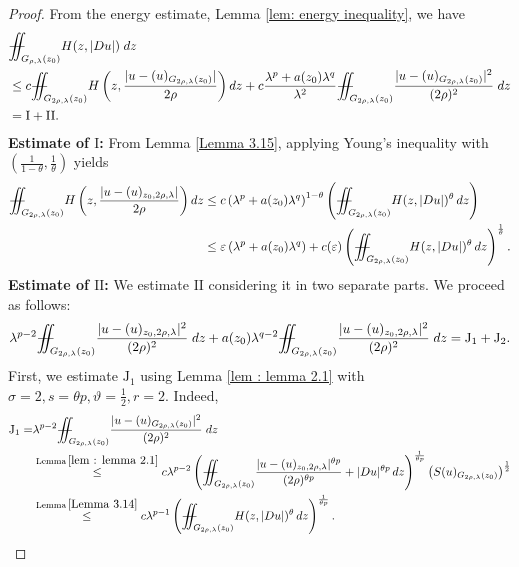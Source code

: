 \documentclass[notitlepage,11pt,reqno]{amsart}
\theoremstyle{definition}
\numberwithin{equation}{section}
\newcommand{\iintss}{{\int\hspace{-0.28cm}\int}}
\newcommand{ \miints }{{\iintss\hspace{-0.56cm} -\hspace{-0.15cm}-}}
\newcommand{\miint}[1]{{\miints_{\hspace{-0.13cm}#1}}}
\begin{document}
\begin{proof}
    From the energy estimate, Lemma \ref{lem: energy inequality}, we have
\begin{align*}
&\miint{G_{\rho, \lambda}(z_0)}H(z,|Du|)\;dz\\
& \leq c \miint{G_{2\rho, \lambda}(z_0)}  H\left(z,\frac{|u-(u)_{G_{2\rho, \lambda}(z_0)}|}{2\rho}\right) dz+ c\frac{\lambda^p+a(z_0)\lambda^q}{\lambda^2}\miint{G_{2\rho, \lambda}(z_0)}\frac{|u-(u)_{G_{2\rho, \lambda}(z_0)}|^2}{(2\rho)^2}\;dz\\
&= \mathrm{I}+\mathrm{II}.
\end{align*}
\textbf{Estimate of $\mathrm{I}$:} From Lemma \ref{Lemma 3.15}, applying Young's inequality with $\left(\frac{1}{1-\theta}, \frac{1}{\theta}\right)$ yields
\begin{align*}
\miint{G_{2\rho, \lambda}(z_0)}  H\left(z,\frac{|u-(u)_{z_0, 2\rho, \lambda}|}{2\rho}\right) dz&\leq c\left(\lambda^p+a(z_0)\lambda^q\right)^{1-\theta}\left(\miint{G_{2 \rho,\lambda}\left(z_0\right)} H(z, |Du|)^{\theta}\, dz\right)\\
&\leq \varepsilon \left(\lambda^p+a(z_0)\lambda^q\right)+ c(\varepsilon) \left(\miint{G_{2 \rho,\lambda}\left(z_0\right)} H(z, |Du|)^{\theta}\, dz\right)^{\frac{1}{\theta}}.
\end{align*}
\textbf{Estimate of $\mathrm{II}$:} We estimate $\mathrm{II}$ considering it in two separate parts. We proceed as follows:
\begin{align*}
\lambda^{p-2}\miint{G_{2\rho, \lambda}(z_0)}\frac{|u-(u)_{z_0, 2\rho, \lambda}|^2}{(2\rho)^2}\;dz +a(z_0)\lambda^{q-2}\miint{G_{2\rho, \lambda}(z_0)}\frac{|u-(u)_{z_0, 2\rho, \lambda}|^2}{(2\rho)^2}\;dz=\mathrm{J_1}+\mathrm{J_2}.
\end{align*}
First, we estimate $\mathrm{J}_1$ using Lemma \ref{lem : lemma 2.1} with $\sigma =2, s=\theta p, \vartheta=\frac{1}{2}, r=2.$ Indeed, 
\begin{align*}
 \mathrm{J}_1=&\lambda^{p-2}\miint{G_{2\rho, \lambda}(z_0)}\frac{|u-(u)_{G_{2\rho, \lambda}(z_0)}|^2}{(2\rho)^2}\;dz\\
 &\overset{\text{Lemma}\,\ref{lem : lemma 2.1}}{\leq} c \lambda^{p-2} \left(\miint{G_{2\rho, \lambda}(z_0)}\frac{|u-(u)_{z_0, 2\rho, \lambda}|^{\theta p}}{(2\rho)^{\theta p}}+|Du|^{\theta p}\,dz\right)^{\frac{1}{\theta p}}\left(S(u)_{G_{2\rho, \lambda}(z_0)}\right)^{\frac{1}{2}}\\
 &\overset{\text{Lemma} \,\ref{Lemma 3.14}}{\leq} c \lambda^{p-1}\left(\miint{G_{2\rho, \lambda}(z_0)}H(z, |Du|)^{\theta}\,dz\right)^{\frac{1}{\theta p}}.

\end{align*}
\end{proof}
\end{document}
